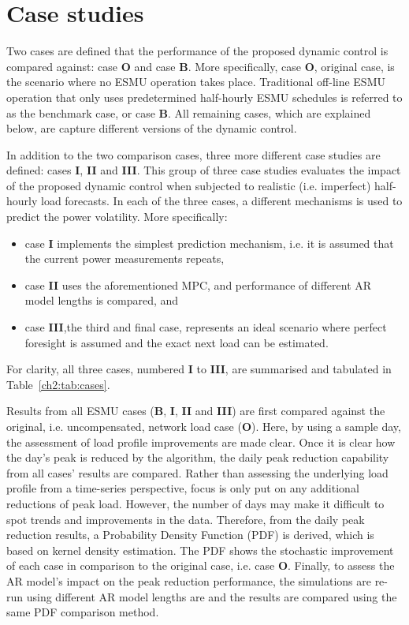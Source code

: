 \section{Case studies}
\label{ch2:sec:case-studies}

Two cases are defined that the performance of the proposed dynamic control is compared against: case \textbf{O} and case \textbf{B}.
More specifically, case \textbf{O}, original case, is the scenario where no ESMU operation takes place.
Traditional off-line ESMU operation that only uses predetermined half-hourly ESMU schedules is referred to as the benchmark case, or case \textbf{B}.
All remaining cases, which are explained below, are capture different versions of the dynamic control.

In addition to the two comparison cases, three more different case studies are defined: cases \textbf{I}, \textbf{II} and \textbf{III}.
This group of three case studies evaluates the impact of the proposed dynamic control when subjected to realistic (i.e. imperfect) half-hourly load forecasts.
In each of the three cases, a different mechanisms is used to predict the power volatility.
More specifically:
\begin{itemize}
	\item case \textbf{I} implements the simplest prediction mechanism, i.e. it is assumed that the current power measurements repeats,
	\item case \textbf{II} uses the aforementioned MPC, and performance of different AR model lengths is compared, and
	\item case \textbf{III},the third and final case, represents an ideal scenario where perfect foresight is assumed and the exact next load can be estimated.
\end{itemize}
For clarity, all three cases, numbered \textbf{I} to \textbf{III}, are summarised and tabulated in Table~\ref{ch2:tab:cases}.



Results from all ESMU cases (\textbf{B}, \textbf{I}, \textbf{II} and \textbf{III}) are first compared against the original, i.e. uncompensated, network load case (\textbf{O}).
Here, by using a sample day, the assessment of load profile improvements are made clear.
Once it is clear how the day's peak is reduced by the algorithm, the daily peak reduction capability from all cases' results are compared.
Rather than assessing the underlying load profile from a time-series perspective, focus is only put on any additional reductions of peak load.
However, the number of days may make it difficult to spot trends and improvements in the data.
Therefore, from the daily peak reduction results, a Probability Density Function (PDF) is derived, which is based on kernel density estimation.
The PDF shows the stochastic improvement of each case in comparison to the original case, i.e. case \textbf{O}.
Finally, to assess the AR model's impact on the peak reduction performance, the simulations are re-run using different AR model lengths are and the results are compared using the same PDF comparison method.
